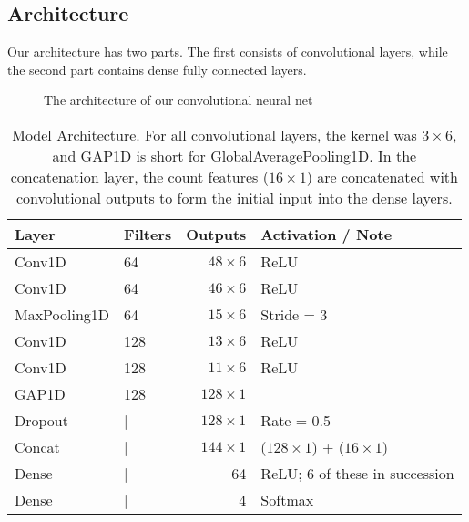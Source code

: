 \subsection{Architecture}
Our architecture has two parts.
The first consists of convolutional layers, while the second part contains dense fully connected layers.


\begin{figure*}[!h]
  \vspace{-0.2cm}
  \centering
   {}
  \caption{The architecture of our convolutional neural net}
  \label{fig:ConvNet}
  \vspace{-0.1cm}
\end{figure*}


\begin{table}[!h]
\begin{center}
\begin{tabular}{llrp{2.5cm}}\toprule
Layer 	&  	 	Filters 	& 	Outputs  	&  	Activation / \newline Note\\\midrule
Conv1D  	&  	64 		& 	$48 \times 6$	&  ReLU \\
Conv1D  & 	64 		&	$46 \times 6 $ 	& ReLU  \\
MaxPooling1D  &  64 		& 	$15 \times 6$	& Stride = 3\\
Conv1D & 		128 	& 	$13 \times 6$&  ReLU\\
Conv1D & 128 & $11 \times 6$ & ReLU\\
GAP1D & 128 & $128 \times 1$ & \\
Dropout & | &  $128 \times 1$ & Rate = 0.5\\
Concat  & | & $144 \times 1$&  ($128 \times 1$) \newline + ($16 \times 1$)\\
Dense & | & 64 & ReLU; 6 of these in succession \\
Dense & | & 4 & Softmax

\end{tabular}
\caption{Model Architecture. For all convolutional layers, the kernel was $3 \times 6$, and GAP1D is short for GlobalAveragePooling1D. In the concatenation layer, the count features ($16 \times 1$) are concatenated with convolutional outputs to form the initial input into the dense layers.}
\label{tab:ArchDescription}
\end{center}
\end{table}

